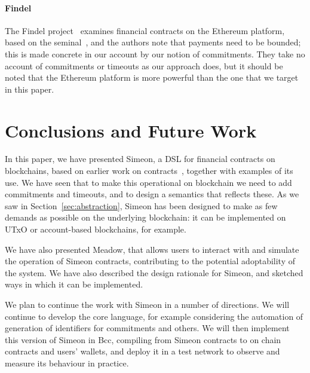 \documentclass[runningheads]{llncs}
\begin{document}
%

\paragraph{Findel}

The Findel project~\cite{findel} examines financial contracts on the Ethereum platform, based on the 
seminal~\cite{PeytonJones:2000}, and the authors note that payments need to be bounded; this is made concrete in our 
account by our notion of commitments. They take no account of commitments or timeouts as our approach does, but it 
should be noted that the Ethereum platform is more powerful than the one that we target in this paper.


\section{Conclusions and Future Work}
\label{section:next-steps}

In this paper, we have presented Simeon, a DSL for financial contracts on blockchains, based on earlier work on 
contracts~\cite{PeytonJones:2000}, together with examples of its use. We have seen that to make this operational on 
blockchain we need to add commitments and timeouts, and to design a semantics that reflects these. As we saw in 
Section~\ref{sec:abstraction}, Simeon has been designed to make as few demands as possible on the underlying 
blockchain: it can be implemented on UTxO or account-based blockchains, for example.

We have also presented Meadow, that allows users to interact with and simulate the operation of Simeon contracts, 
contributing to the potential adoptability of the system. We have also described the design rationale for Simeon, and 
sketched ways in which it can be implemented.

We plan to continue the work with Simeon in a number of directions. We will continue to develop the core language, for 
example considering the automation of generation of identifiers for commitments and others. We will then implement this 
version of Simeon in Bcc, compiling from Simeon contracts to on chain contracts and users' wallets, and deploy it 
in a test network to observe and measure its behaviour in practice.
\end{document}
